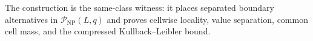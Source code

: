 The construction is the same-class witness: it places separated boundary alternatives in \(\mathcal P_{\mathrm{NP}}(L,q)\) and proves cellwise locality, value separation, common cell mass, and the compressed Kullback--Leibler bound.